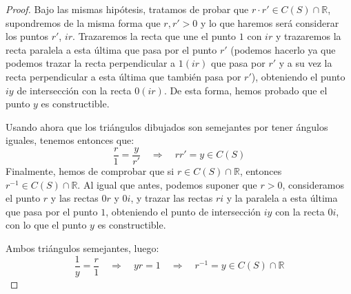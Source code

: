 \begin{prop}
\begin{proof}
        \noindent
        Bajo las mismas hipótesis, tratamos de probar que $r\cdot r'\in C(S)\cap \mathbb{R}$, supondremos de la misma forma que $r,r'>0$ y lo que haremos será considerar los puntos $r'$, $ir$. Trazaremos la recta que une el punto $1$ con $ir$ y trazaremos la recta paralela a esta última que pasa por el punto $r'$ (podemos hacerlo ya que podemos trazar la recta perpendicular a $1(ir)$ que pasa por $r'$ y a su vez la recta perpendicular a esta última que también pasa por $r'$), obteniendo el punto $iy$ de intersección con la recta $0(ir)$. De esta forma, hemos probado que el punto $y$ es constructible.
        \begin{figure}[H]
            \centering
        \end{figure}
        \noindent
        Usando ahora que los triángulos dibujados son semejantes por tener ángulos iguales, tenemos entonces que:
        \begin{equation*}
            \dfrac{r}{1} = \dfrac{y}{r'} \quad \Longrightarrow \quad  rr'=y\in C(S)
        \end{equation*}
        Finalmente, hemos de comprobar que si $r\in C(S)\cap \mathbb{R}$, entonces $r^{-1}\in C(S)\cap \mathbb{R}$. Al igual que antes, podemos suponer que $r>0$, consideramos el punto $r$ y las rectas $0r$ y $0i$, y trazar las rectas $ri$ y la paralela a esta última que pasa por el punto $1$, obteniendo el punto de intersección $iy$ con la recta $0i$, con lo que el punto $y$ es constructible.
        \begin{figure}[H]
            \centering
        \end{figure}
        Ambos triángulos semejantes, luego:
        \begin{equation*}
            \dfrac{1}{y} = \dfrac{r}{1} \quad \Longrightarrow \quad  yr = 1 \quad \Longrightarrow\quad  r^{-1} = y\in C(S)\cap \mathbb{R}
        \end{equation*}
    \end{proof}
\end{prop}

